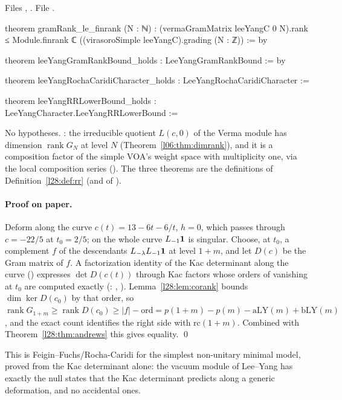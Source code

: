 \noindent Files , .
\noindent File .
\begin{leancode}
theorem gramRank_le_finrank (N : ℕ) :
    (vermaGramMatrix leeYangC 0 N).rank ≤
      Module.finrank ℂ ((virasoroSimple leeYangC).grading (N : ℤ)) := by

theorem leeYangGramRankBound_holds : LeeYangGramRankBound := by

theorem leeYangRochaCaridiCharacter_holds : LeeYangRochaCaridiCharacter :=

theorem leeYangRRLowerBound_holds : LeeYangCharacter.LeeYangRRLowerBound :=
\end{leancode}

\begin{dictionary}
No hypotheses. : the irreducible quotient $L(c,0)$ of the Verma module has dimension $\operatorname{rank}G_N$ at level $N$
(Theorem~\ref{l06:thm:dimrank}), and it is a composition factor of the simple VOA's weight space with multiplicity one, via the local composition series
(). The three  theorems are the definitions of Definition~\ref{l28:def:rr} (and of ).
\end{dictionary}

\paragraph{Proof on paper.} Deform along the curve $c(t)=13-6t-6/t$, $h=0$, which passes through $c=-22/5$ at $t_0=2/5$; on the whole curve $L_{-1}\mathbf 1$
is singular. Choose, at $t_0$, a complement $f$ of the descendants $L_{-\lambda}L_{-1}\mathbf 1$ at level $1+m$, and let $D(c)$ be the Gram matrix of $f$. A
factorization identity of the Kac determinant along the curve () expresses $\det D(c(t))$ through Kac factors whose orders of vanishing
at $t_0$ are computed exactly (: , ). Lemma~\ref{l28:lem:corank} bounds $\dim\ker D(c_0)$ by that order, so
$\operatorname{rank}G_{1+m}\ge\operatorname{rank}D(c_0)\ge|f|-\mathrm{ord}=p(1+m)-p(m)-\mathrm{aLY}(m)+\mathrm{bLY}(m)$, and the exact count
 identifies the right side with $\mathrm{rc}(1+m)$. Combined with Theorem~\ref{l28:thm:andrews} this gives equality. \qed

\begin{physics}
This is Feigin--Fuchs/Rocha-Caridi for the simplest non-unitary minimal model, proved from the Kac determinant alone: the vacuum module of Lee--Yang has exactly the
null states that the Kac determinant predicts along a generic deformation, and no accidental ones.
\end{physics}

